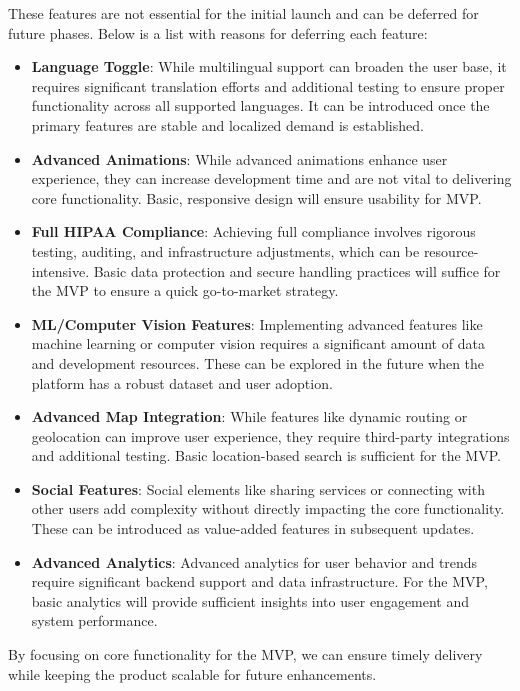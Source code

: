 These features are not essential for the initial launch and can be deferred for future phases. Below is a list with reasons for deferring each feature:  
\begin{itemize}
\setlength{\itemsep}{0.5em}
    \item \textbf{Language Toggle}: While multilingual support can broaden the user base, it requires significant translation efforts and additional testing to ensure proper functionality across all supported languages. It can be introduced once the primary features are stable and localized demand is established.  
    \item \textbf{Advanced Animations}: While advanced animations enhance user experience, they can increase development time and are not vital to delivering core functionality. Basic, responsive design will ensure usability for MVP.  
    \item \textbf{Full HIPAA Compliance}: Achieving full compliance involves rigorous testing, auditing, and infrastructure adjustments, which can be resource-intensive. Basic data protection and secure handling practices will suffice for the MVP to ensure a quick go-to-market strategy.  
    \item \textbf{ML/Computer Vision Features}: Implementing advanced features like machine learning or computer vision requires a significant amount of data and development resources. These can be explored in the future when the platform has a robust dataset and user adoption.  
    \item \textbf{Advanced Map Integration}: While features like dynamic routing or geolocation can improve user experience, they require third-party integrations and additional testing. Basic location-based search is sufficient for the MVP.  
    \item \textbf{Social Features}: Social elements like sharing services or connecting with other users add complexity without directly impacting the core functionality. These can be introduced as value-added features in subsequent updates.  
    \item \textbf{Advanced Analytics}: Advanced analytics for user behavior and trends require significant backend support and data infrastructure. For the MVP, basic analytics will provide sufficient insights into user engagement and system performance.  
\end{itemize}
By focusing on core functionality for the MVP, we can ensure timely delivery while keeping the product scalable for future enhancements.


